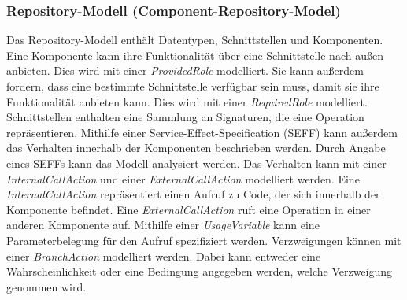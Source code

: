 \subsubsection*{Repository-Modell (Component-Repository-Model)} 
Das Repository-Modell enthält Datentypen, Schnittstellen und Komponenten. Eine Komponente kann ihre Funktionalität über eine Schnittstelle nach außen anbieten. Dies wird mit einer \emph{ProvidedRole} modelliert. Sie kann außerdem fordern, dass eine bestimmte Schnittstelle verfügbar sein muss, damit sie ihre Funktionalität anbieten kann. Dies wird mit einer \emph{RequiredRole} modelliert. Schnittstellen enthalten eine Sammlung an Signaturen, die eine Operation repräsentieren. 
Mithilfe einer Service-Effect-Specification (SEFF) kann außerdem das Verhalten innerhalb der Komponenten beschrieben werden. Durch Angabe eines SEFFs kann das Modell analysiert werden. Das Verhalten kann mit einer \emph{InternalCallAction} und einer \emph{ExternalCallAction} modelliert werden. Eine \emph{InternalCallAction} repräsentiert einen Aufruf zu Code, der sich innerhalb der Komponente befindet. Eine \emph{ExternalCallAction} ruft eine Operation in einer anderen Komponente auf. Mithilfe einer \emph{UsageVariable} kann eine Parameterbelegung für den Aufruf spezifiziert werden.
Verzweigungen können mit einer \emph{BranchAction} modelliert werden. Dabei kann entweder eine Wahrscheinlichkeit oder eine Bedingung angegeben werden, welche Verzweigung genommen wird. 
